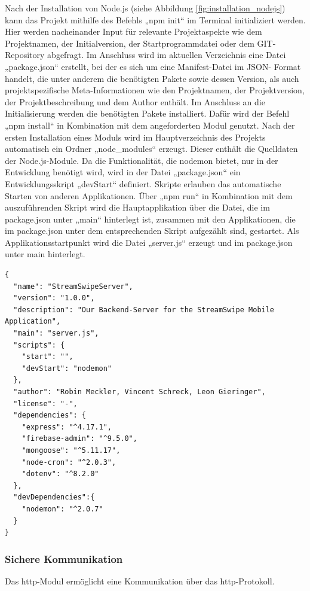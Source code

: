 \noindent
Nach der Installation von Node.js (siehe Abbildung \ref{fig:installation_nodejs}) kann das Projekt mithilfe des Befehls „npm init“ im Terminal initializiert werden. 
Hier werden nacheinander Input für relevante Projektaspekte wie dem Projektnamen, der Initialversion, der Startprogrammdatei oder dem GIT-Repository abgefragt.  
Im Anschluss wird im aktuellen Verzeichnis eine Datei „package.json“ erstellt,  bei der es sich um eine Manifest-Datei im JSON- Format handelt, die unter anderem die benötigten Pakete sowie dessen Version, als auch projektspezifische Meta-Informationen wie den Projektnamen, der Projektversion, der Projektbeschreibung und dem Author enthält.
\newline
Im Anschluss an die Initialisierung werden die benötigten Pakete installiert. Dafür wird der Befehl „npm install“ in Kombination mit dem angeforderten Modul genutzt. 
Nach der ersten Installation eines Moduls wird im Hauptverzeichnis des Projekts automatisch ein Ordner „node\_modules“ erzeugt. Dieser enthält die Quelldaten der Node.js-Module. 
\newline
Da die Funktionalität, die nodemon bietet, nur in der Entwicklung benötigt wird, wird in der Datei „package.json“ ein Entwicklungsskript „devStart“ definiert. 
Skripte erlauben das automatische Starten von anderen Applikationen. Über „npm run“ in Kombination mit dem auszuführenden Skript wird die Hauptapplikation über die Datei, die im package.json unter „main“ hinterlegt ist, zusammen mit den Applikationen, die im package.json unter dem entsprechenden Skript aufgezählt sind, gestartet.
\newline
Als Applikationsstartpunkt wird die Datei „server.js“ erzeugt und im package.json unter main hinterlegt. 

\begin{lstlisting}[caption=Datei package.json, label=lst:packagejson]
{
  "name": "StreamSwipeServer",
  "version": "1.0.0",
  "description": "Our Backend-Server for the StreamSwipe Mobile Application",
  "main": "server.js",
  "scripts": {
    "start": "",
    "devStart": "nodemon"
  },
  "author": "Robin Meckler, Vincent Schreck, Leon Gieringer",
  "license": "-",
  "dependencies": {
    "express": "^4.17.1",
    "firebase-admin": "^9.5.0",
    "mongoose": "^5.11.17",
    "node-cron": "^2.0.3",
    "dotenv": "^8.2.0"
  },
  "devDependencies":{
    "nodemon": "^2.0.7"
  }
}
\end{lstlisting}

\subsubsection{Sichere Kommunikation}
\label{sec:SichereKommunikation}
Das http-Modul ermöglicht eine Kommunikation über das http-Protokoll.\\
 
